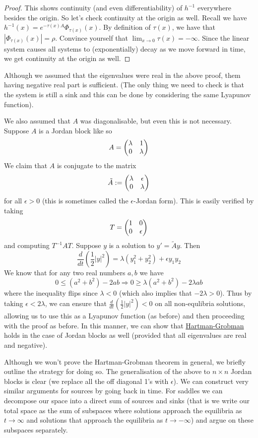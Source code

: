 \begin{proof}
This shows continuity (and even differentiability) of $h^{-1}$ everywhere besides the origin. So let's check continuity at the origin as well. Recall we have $h^{-1}(x) = e^{-\tau(x) A} \Phi_{\tau(x)}(x)$. By definition of $\tau(x)$, we have that $|\Phi_{\tau(x)}(x)| = \rho$. Convince yourself that $\lim_{x \to 0} \tau(x) = -\infty$. Since the linear system causes all systems to (exponentially) decay as we move forward in time, we get continuity at the origin as well.
\end{proof}

Although we assumed that the eigenvalues were real in the above proof, them having negative real part is sufficient. (The only thing we need to check is that the system is still a sink and this can be done by considering the same Lyapunov function).

We also assumed that $A$ was diagonalisable, but even this is not necessary. Suppose $A$ is a Jordan block like so
$$ A = \begin{pmatrix} \lambda & 1\\0 & \lambda \end{pmatrix} $$
We claim that $A$ is conjugate to the matrix
$$ \tilde{A} := \begin{pmatrix} \lambda & \epsilon \\0 & \lambda \end{pmatrix} $$
for all $\epsilon > 0$ (this is sometimes called the $\epsilon$-Jordan form). This is easily verified by taking
$$ T = \begin{pmatrix} 1 & 0\\0 & \epsilon \end{pmatrix} $$
and computing $T^{-1} A T$. Suppose $y$ is a solution to $y' = \tilde{A} y$. Then
$$ \frac{d}{dt} \left( \frac{1}{2} \left| y \right|^2 \right) = \lambda(y_1^2 + y_2^2) + \epsilon y_1 y_2 $$
We know that for any two real numbers $a, b$ we have
$$ 0 \leq (a^2 + b^2) - 2ab \Rightarrow 0 \geq \lambda (a^2 + b^2) - 2\lambda ab$$
where the inequality flips since $\lambda < 0$ (which also implies that $-2 \lambda > 0$). Thus by taking $\epsilon < 2 \lambda$, we can ensure that $\frac{d}{dt} (\frac{1}{2} |y|^2) < 0$ on all non-equlibria solutions, allowing us to use this as a Lyapunov function (as before) and then proceeding with the proof as before. In this manner, we can show that \hyperref[thm:hartman-grobman]{Hartman-Grobman} holds in the case of Jordan blocks as well (provided that all eigenvalues are real and negative).

Although we won't prove the Hartman-Grobman theorem in general, we briefly outline the strategy for doing so. The generalisation of the above to $n \times n$ Jordan blocks is clear (we replace all the off diagonal 1's with $\epsilon$). We can construct very similar arguments for sources by going back in time. For saddles we can decompose our space into a direct sum of sources and sinks (that is we write our total space as the sum of subspaces where solutions approach the equilibria as $t \to \infty$ and solutions that approach the equilibria as $t \to -\infty$) and argue on these subspaces separately. 

